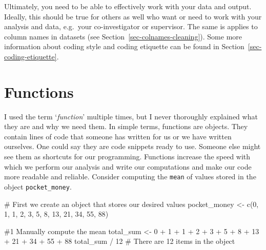 \documentclass[
  letterpaper,
]{krantz}
\makeatletter
\newenvironment{Shaded}{\begin{snugshade}}{\end{snugshade}}
\newcommand{\CommentTok}[1]{\textcolor[rgb]{0.37,0.37,0.37}{#1}}
\newcommand{\DecValTok}[1]{\textcolor[rgb]{0.68,0.00,0.00}{#1}}
\newcommand{\FunctionTok}[1]{\textcolor[rgb]{0.28,0.35,0.67}{#1}}
\newcommand{\NormalTok}[1]{\textcolor[rgb]{0.00,0.23,0.31}{#1}}
\newcommand{\OtherTok}[1]{\textcolor[rgb]{0.00,0.23,0.31}{#1}}
\newcommand{\SpecialCharTok}[1]{\textcolor[rgb]{0.37,0.37,0.37}{#1}}
\newenvironment{kframe}{%
\medskip{}
\setlength{\fboxsep}{.8em}
 \def\at@end@of@kframe{}%
 \ifinner\ifhmode%
  \def\at@end@of@kframe{\end{minipage}}%
  \begin{minipage}{\columnwidth}%
 \fi\fi%
 \def\FrameCommand##1{\hskip\@totalleftmargin \hskip-\fboxsep
 \colorbox{shadecolor}{##1}\hskip-\fboxsep
     \hskip-\linewidth \hskip-\@totalleftmargin \hskip\columnwidth}%
 \MakeFramed {\advance\hsize-\width
   \@totalleftmargin\z@ \linewidth\hsize
   \@setminipage}}%
 {\par\unskip\endMakeFramed%
 \at@end@of@kframe}
\renewenvironment{Shaded}{\begin{kframe}}{\end{kframe}}
\makeatother
\begin{document}
Ultimately, you need to be able to effectively work with your data and
output. Ideally, this should be true for others as well who want or need
to work with your analysis and data, e.g.~your co-investigator or
supervisor. The same is applies to column names in datasets (see
Section~\ref{sec-colnames-cleaning}). Some more information about coding
style and coding etiquette can be found in
Section~\ref{sec-coding-etiquette}.

\section{Functions}\label{sec-functions}

I used the term `\emph{function}' multiple times, but I never thoroughly
explained what they are and why we need them. In simple terms, functions
are objects. They contain lines of code that someone has written for us
or we have written ourselves. One could say they are code snippets ready
to use. Someone else might see them as shortcuts for our programming.
Functions increase the speed with which we perform our analysis and
write our computations and make our code more readable and reliable.
Consider computing the \texttt{mean} of values stored in the object
\texttt{pocket\_money}.

\begin{Shaded}
\begin{Highlighting}[]
\CommentTok{\# First we create an object that stores our desired values}
\NormalTok{pocket\_money }\OtherTok{\textless{}{-}} \FunctionTok{c}\NormalTok{(}\DecValTok{0}\NormalTok{, }\DecValTok{1}\NormalTok{, }\DecValTok{1}\NormalTok{, }\DecValTok{2}\NormalTok{, }\DecValTok{3}\NormalTok{, }\DecValTok{5}\NormalTok{, }\DecValTok{8}\NormalTok{, }\DecValTok{13}\NormalTok{, }\DecValTok{21}\NormalTok{, }\DecValTok{34}\NormalTok{, }\DecValTok{55}\NormalTok{, }\DecValTok{88}\NormalTok{)}

\CommentTok{\#1 Manually compute the mean}
\NormalTok{total\_sum }\OtherTok{\textless{}{-}} \DecValTok{0} \SpecialCharTok{+} \DecValTok{1} \SpecialCharTok{+} \DecValTok{1} \SpecialCharTok{+} \DecValTok{2} \SpecialCharTok{+} \DecValTok{3} \SpecialCharTok{+} \DecValTok{5} \SpecialCharTok{+} \DecValTok{8} \SpecialCharTok{+} \DecValTok{13} \SpecialCharTok{+} \DecValTok{21} \SpecialCharTok{+} \DecValTok{34} \SpecialCharTok{+} \DecValTok{55} \SpecialCharTok{+} \DecValTok{88}
\NormalTok{total\_sum }\SpecialCharTok{/} \DecValTok{12} \CommentTok{\# There are 12 items in the object}
\end{Highlighting}
\end{Shaded}
\end{document}
